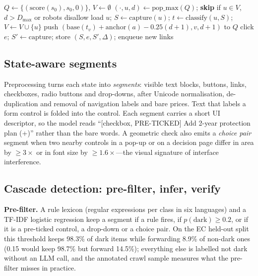 \documentclass[conference]{IEEEtran}
\begin{document}
\begin{algorithm}[t]
\caption{Priority-guided crawl with safe interaction}
\label{alg:crawl}
\footnotesize
\begin{algorithmic}[1]
\State $Q \gets \{(\mathrm{score}(s_0), s_0, 0)\}$, $V \gets \emptyset$
  \State $(\cdot, u, d) \gets \mathrm{pop\_max}(Q)$; \textbf{skip} if $u \in V$, $d > D_{\max}$ or robots disallow
  \State load $u$; $S \gets \mathrm{capture}(u)$; $t \gets \mathrm{classify}(u, S)$; $V \gets V \cup \{u\}$
    \State push $(\mathrm{base}(t_v) + \mathrm{anchor}(a) - 0.25(d{+}1), v, d{+}1)$ to $Q$
  \EndFor
    \State click $e$; $S' \gets \mathrm{capture}$; store $(S, e, S', \Delta)$; enqueue new links
  \EndFor
\EndWhile
\end{algorithmic}
\end{algorithm}

\subsection{State-aware segments}
Preprocessing turns each state into \emph{segments}: visible text blocks, buttons, links, checkboxes,
radio buttons and drop-downs, after Unicode normalisation, de-duplication and removal of navigation
labels and bare prices. Text that labels a form control is folded into the control. Each segment carries
a short UI descriptor, so the model reads ``[checkbox, PRE-TICKED] Add 2-year protection plan
(+)'' rather than the bare words. A geometric check also emits a \emph{choice pair} segment when
two nearby controls in a pop-up or on a decision page differ in area by $\geq 3\times$ or in font size by
$\geq 1.6\times$---the visual signature of interface interference.

\subsection{Cascade detection: pre-filter, infer, verify}
\textbf{Pre-filter.} A rule lexicon (regular expressions per class in six languages) and a TF-IDF logistic
regression keep a segment if a rule fires, if $p(\text{dark}) \geq 0.2$, or if it is a pre-ticked control, a
drop-down or a choice pair. On the EC held-out split this threshold keeps 98.3\% of dark items while forwarding
8.9\% of non-dark ones (0.15 would keep 98.7\% but forward 14.5\%); everything else is labelled not dark without
an LLM call, and the annotated crawl sample measures what the pre-filter misses in practice.
\end{document}
